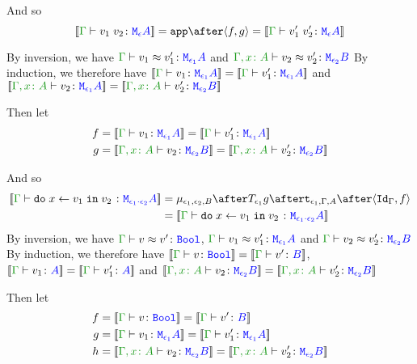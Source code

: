 \documentclass{report}
\begin{document}
And so
\begin{equation}
    \deno{\gtyperelation{\apply{v_1}{v_2}}{\M{\e}{A}}} = \app\after\pr{f}{g} = \deno{\gtyperelation{\apply{v_1'}{v_2'}}{\M{\e}{A}}}
\end{equation}


By inversion, we have $\gberelation{v_1}{v_1'}{\M{\e_1}{A}}$ and $\berelation{\gax}{v_2}{v_2'}{\M{\e_2}{B}}$
By induction, we therefore have $\deno{\gtyperelation{v_1}{\M{\e_1}{A}}}= \deno{\gtyperelation{v_1'}{\M{\e_1}{A}}}$ and $\deno{\typerelation{\gax}{v_2}{\M{\e_1}{A}}} = \deno{\typerelation{\gax}{v_2'}{\M{\e_2}{B}}}$

Then let
\begin{align*}
    f &{}=\deno{\gtyperelation{v_1}{\M{\e_1}{A}}}= \deno{\gtyperelation{v_1'}{\M{\e_1}{A}}}\\
    g &{}=\deno{\typerelation{\gax}{v_2}{\M{\e_2}{B}}} = \deno{\typerelation{\gax}{v_2'}{\M{\e_2}{B}}}
\end{align*}



And so
\begin{equation}
    \begin{split}
        \deno{\gtyperelation{\doin{x}{v_1}{v_2}}{\M{\e_1\dot\e_2}{A}}} & = \bind{\e_1}{\e_2}{B} \after \T{\e_1}{g} \after \tstrength{\e_1}{\G}{A} \after \pr{\idg}{f}\\
         & = \deno{\gtyperelation{\doin{x}{v_1}{v_2}}{\M{\e_1\dot\e_2}{A}}}
    \end{split}
\end{equation}
By inversion, we have $\gberelation{v}{v'}{\B}$, $\gberelation{v_1}{v_1'}{\M{\e_1}{A}}$ and $\gberelation{v_2}{v_2'}{\M{\e_2}{B}}$
By induction, we therefore have $\deno{\gtyperelation{v}{\B}} = \deno{\gtyperelation{v'}{B}}$, $\deno{\gtyperelation{v_1}{ A}}= \deno{\gtyperelation{v_1'}{ A}}$ and $\deno{\typerelation{\gax}{v_2}{\M{\e_2}{B}}} = \deno{\typerelation{\gax}{v_2'}{\M{\e_2}{B}}}$

Then let
\begin{align*}
    f &{}=\deno{\gtyperelation{v}{\B}} = \deno{\gtyperelation{v'}{B}}\\
    g &{}=\deno{\gtyperelation{v_1}{\M{\e_1}{A}}}= \deno{\gtyperelation{v_1'}{\M{\e_1}{A}}}\\
    h &{}=\deno{\typerelation{\gax}{v_2}{\M{\e_2}{B}}} = \deno{\typerelation{\gax}{v_2'}{\M{\e_2}{B}}}
\end{align*}
\end{document}
